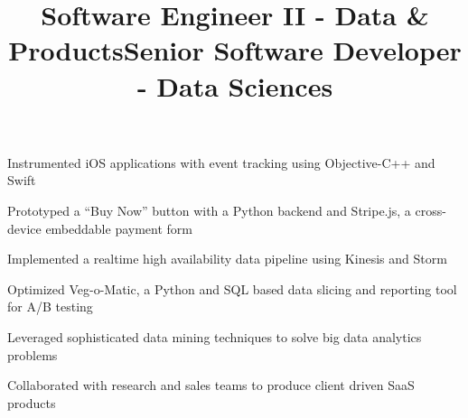\documentclass[12pt, tweaklist, line]{res}
\let\tempone\itemize
\let\temptwo\enditemize
\renewenvironment{itemize}{\tempone\vspace{-.15in}\setlength{\topsep}{0pt}\setlength{\itemsep}{3pt}\vspace{-.15in}}{\temptwo}
\def\Cplusplus{C++}
\begin{document}
\begin{resume}
\title{Software Engineer II - Data \& Products}
\begin{position}
\begin{itemize}
\item Instrumented iOS applications with event tracking using Objective-C++ and Swift
\item Prototyped a ``Buy Now'' button with a Python backend and Stripe.js, a cross-device embeddable payment form
\item Implemented a realtime high availability data pipeline using Kinesis and Storm
\item Optimized Veg-o-Matic, a Python and SQL based data slicing and reporting tool for A/B testing
\end{itemize}
\end{position}

\title{Senior Software Developer - Data Sciences}
\begin{position}
\begin{itemize}
\item Leveraged sophisticated data mining techniques to solve big data analytics problems
\item Collaborated with research and sales teams to produce client driven SaaS products
\end{itemize}
\end{position}


\end{resume}
\end{document}
